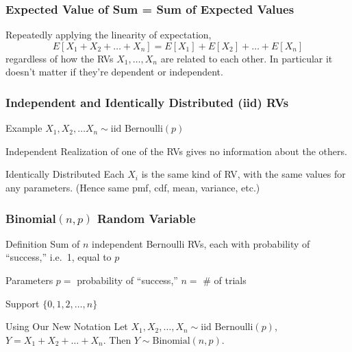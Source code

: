 \documentclass[handout]{beamer}
\begin{document}
\begin{frame}
\frametitle{Expected Value of Sum = Sum of Expected Values}
Repeatedly applying the linearity of expectation,
$$E[X_1 + X_2 + \hdots + X_n] = E[X_1] + E[X_2] + \hdots + E[X_n]$$
regardless of how the RVs $X_1, \hdots, X_n$ are related to each other. In particular it \alert{doesn't matter if they're dependent or independent}.


\end{frame}
\begin{frame}
\frametitle{Independent and Identically Distributed (iid) RVs}

\begin{block}{Example}
	$X_1, X_2, \hdots X_n \sim \mbox{iid Bernoulli}(p)$
\end{block}

\begin{block}{Independent}
Realization of one of the RVs gives no information about the others.
\end{block}

\begin{block}{Identically Distributed}
Each $X_i$ is the same kind of RV, with the same values for any parameters. (Hence same pmf, cdf, mean, variance, etc.)
\end{block}

\end{frame}
\begin{frame}
\frametitle{Binomial$(n,p)$ Random Variable}

\begin{block}{Definition}
Sum of $n$ independent Bernoulli RVs, each with probability of ``success,'' i.e.\ 1, equal to $p$
\end{block}


\begin{block}{Parameters}
$p =$ probability of ``success,'' $n=$ \# of trials
\end{block}


\begin{block}{Support} 
$\{0, 1, 2, \hdots, n\}$
\end{block}


\begin{alertblock}{Using Our New Notation}
Let $X_1, X_2, \hdots, X_n \sim \mbox{iid Bernoulli}(p)$, $Y = X_1 + X_2 + \hdots + X_n$. Then $Y \sim \mbox{Binomial}(n,p)$.
\end{alertblock}


\end{frame}
\end{document}
